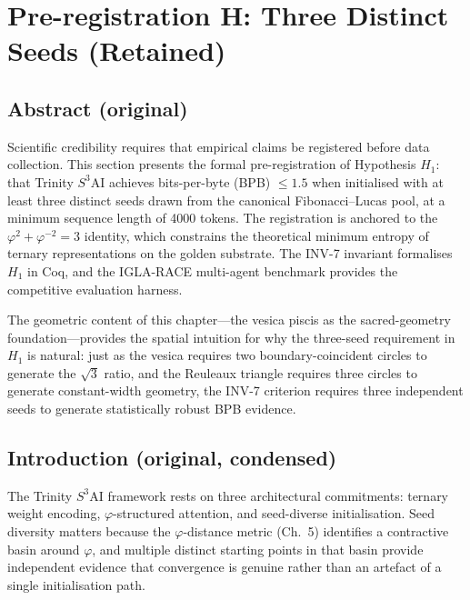 
\section{Pre-registration H: Three Distinct Seeds (Retained)}
\label{sec:ch11-prereg}

\subsection{Abstract (original)}
\label{subsec:ch11-prereg-abstract}

Scientific credibility requires that empirical
claims be registered before data collection. This
section presents the formal pre-registration of
Hypothesis \(H_1\): that Trinity \(S^3\)AI achieves
bits-per-byte (BPB) \(\leq 1.5\) when initialised
with at least three distinct seeds drawn from the
canonical Fibonacci--Lucas pool, at a minimum
sequence length of 4000 tokens. The registration
is anchored to the
\(\varphi^2 + \varphi^{-2} = 3\) identity, which
constrains the theoretical minimum entropy of
ternary representations on the golden substrate.
The INV-7 invariant formalises \(H_1\) in Coq, and the
IGLA-RACE multi-agent benchmark provides the
competitive evaluation harness.

The geometric content of this chapter—the vesica piscis as the
sacred-geometry foundation—provides the spatial intuition for why the
three-seed requirement in \(H_1\) is natural:
just as the vesica requires two boundary-coincident circles to generate
the \(\sqrt{3}\) ratio, and the Reuleaux triangle requires three circles
to generate constant-width geometry, the INV-7 criterion requires three
independent seeds to generate statistically robust BPB evidence.

\subsection{Introduction (original, condensed)}
\label{subsec:ch11-prereg-intro}

The Trinity \(S^3\)AI framework rests on three
architectural commitments: ternary weight
encoding, \(\varphi\)-structured attention, and
seed-diverse initialisation.
Seed diversity matters because the \(\varphi\)-distance metric
(Ch.~5) identifies a contractive basin around
\(\varphi\), and multiple distinct starting points
in that basin provide independent evidence that
convergence is genuine rather than an artefact of
a single initialisation path.

